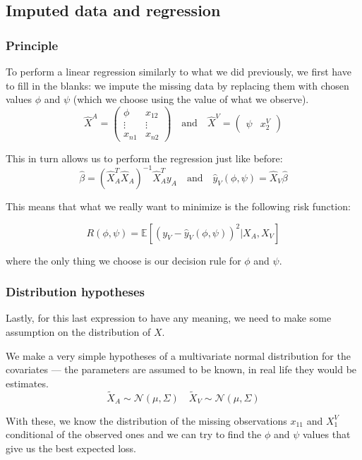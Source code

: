 \documentclass[12pt, a4paper]{memoir}
\begin{document}
		\subsection{Imputed data and regression}
			\subsubsection{Principle}
To perform a linear regression similarly to what we did previously, we first have to fill in the blanks: we impute the missing data by replacing them with chosen values $\phi$ and $\psi$ (which we choose using the value of what we observe).
\begin{equation*}
\hat{X}^A = 
\begin{pmatrix}
\phi & x_{12} \\
\vdots & \vdots \\
x_{n1} & x_{n2}
\end{pmatrix}
\quad \mathrm{and} \quad
\hat{X}^V = 
\begin{pmatrix}
\psi & x_{2}^V
\end{pmatrix}
\end{equation*}

This in turn allows us to perform the regression just like before:
$$
\hat{\beta} = (\hat{X}_A^T \hat{X}_A)^{-1} \hat{X}_A^T y_A 
\quad \mathrm{and} \quad
\hat{y}_V (\phi, \psi) = \hat{X}_V \hat{\beta} 
$$

This means that what we really want to minimize is the following risk function:

$$R(\phi, \psi) = \mathbb{E}[(y_V - \hat{y}_V(\phi,\psi))^2 \vert X_A, X_V]$$

where the only thing we choose is our decision rule for $\phi$ and $\psi$.
			\subsubsection{Distribution hypotheses}
Lastly, for this last expression to have any meaning, we need to make some assumption on the distribution of $X$.

We make a very simple hypotheses of a multivariate normal distribution for the covariates --- the parameters are assumed to be known, in real life they would be estimates.
$$
\tilde{X}_A \sim \mathcal{N}(\mu, \Sigma) \quad \tilde{X}_V \sim \mathcal{N}(\mu, \Sigma)
$$

With these, we know the distribution of the missing observations $x_{11}$ and $X_1^V$ conditional of the observed ones and we can try to find the $\phi$ and $\psi$ values that give us the best expected loss.
\end{document}
